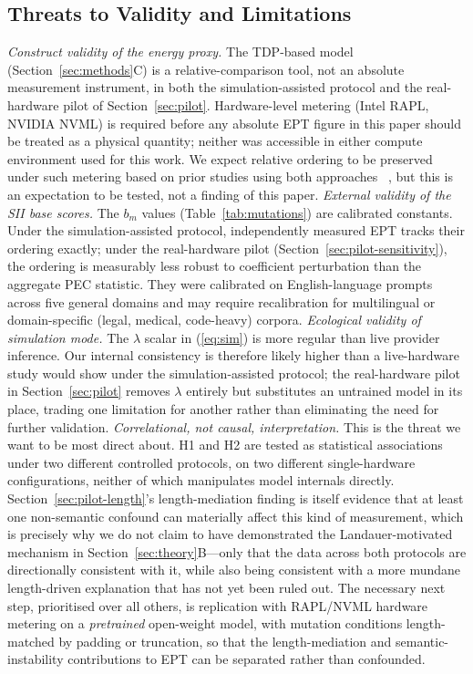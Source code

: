 \documentclass[conference]{IEEEtran}
\begin{document}
\subsection{Threats to Validity and Limitations}
\label{sec:limits}
\textit{Construct validity of the energy proxy.} The TDP-based model
(Section~\ref{sec:methods}C) is a relative-comparison tool, not an
absolute measurement instrument, in both the simulation-assisted
protocol and the real-hardware pilot of Section~\ref{sec:pilot}.
Hardware-level metering (Intel RAPL, NVIDIA NVML) is required before
any absolute EPT figure in this paper should be treated as a physical
quantity; neither was accessible in either compute environment used
for this work. We expect relative ordering to be preserved under such
metering based on prior studies using both approaches
~\cite{samsi2023words,bannour2021evaluating}, but this is an
expectation to be tested, not a finding of this paper.
\textit{External validity of the SII base scores.} The $b_m$ values
(Table~\ref{tab:mutations}) are calibrated constants. Under the
simulation-assisted protocol, independently measured EPT tracks their
ordering exactly; under the real-hardware pilot
(Section~\ref{sec:pilot-sensitivity}), the ordering is measurably less
robust to coefficient perturbation than the aggregate PEC statistic.
They were calibrated on English-language prompts across five general
domains and may require recalibration for multilingual or
domain-specific (legal, medical, code-heavy) corpora.
\textit{Ecological validity of simulation mode.} The $\lambda$ scalar
in (\ref{eq:sim}) is more regular than live provider inference. Our
internal consistency is therefore likely higher than a live-hardware
study would show under the simulation-assisted protocol; the
real-hardware pilot in Section~\ref{sec:pilot} removes $\lambda$
entirely but substitutes an untrained model in its place, trading one
limitation for another rather than eliminating the need for further
validation.
\textit{Correlational, not causal, interpretation.} This is the
threat we want to be most direct about. H1 and H2 are tested as
statistical associations under two different controlled protocols, on
two different single-hardware configurations, neither of which
manipulates model internals directly. Section~\ref{sec:pilot-length}'s
length-mediation finding is itself evidence that at least one
non-semantic confound can materially affect this kind of measurement,
which is precisely why we do not claim to have demonstrated the
Landauer-motivated mechanism in Section~\ref{sec:theory}B---only that
the data across both protocols are directionally consistent with it,
while also being consistent with a more mundane length-driven
explanation that has not yet been ruled out. The necessary next step,
prioritised over all others, is replication with RAPL/NVML hardware
metering on a \emph{pretrained} open-weight model, with mutation
conditions length-matched by padding or truncation, so that the
length-mediation and semantic-instability contributions to EPT can be
separated rather than confounded.
\end{document}
